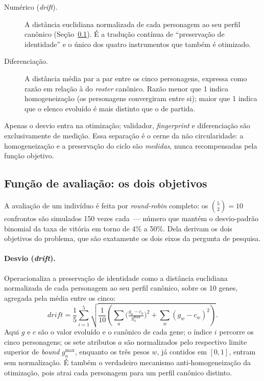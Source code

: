 \documentclass[12pt]{article}
\begin{document}
\begin{description}
\item[Numérico (\emph{drift}).] A distância euclidiana normalizada de cada
personagem ao seu perfil canônico (Seção~\ref{sec:fitness}). É a tradução contínua
de ``preservação de identidade'' e o único dos quatro instrumentos que também é
otimizado.

\item[Diferenciação.] A distância média par a par entre os cinco personagens,
expressa como razão em relação à do \emph{roster} canônico. Razão menor que 1
indica homogeneização (os personagens convergiram entre si); maior que 1 indica
que o elenco evoluído é mais distinto que o de partida.
\end{description}

Apenas o desvio entra na otimização; validador, \emph{fingerprint} e diferenciação
são exclusivamente de medição. Essa separação é o cerne da não circularidade: a
homogeneização e a preservação do ciclo são \emph{medidas}, nunca recompensadas
pela função objetivo.

\subsection{Função de avaliação: os dois objetivos}
\label{sec:fitness}

A avaliação de um indivíduo é feita por \emph{round-robin} completo: os
$\binom{5}{2}=10$ confrontos são simulados 150 vezes cada~--- número que mantém o
desvio-padrão binomial da taxa de vitória em torno de 4\% a 50\%. Dela derivam os
dois objetivos do problema, que são exatamente os dois eixos da pergunta de pesquisa.

\paragraph{Desvio (\emph{drift}).} Operacionaliza a preservação de identidade
como a distância euclidiana normalizada de cada personagem ao seu perfil
canônico, sobre os 10 genes, agregada pela média entre os cinco:
\begin{equation}
\textit{drift} = \frac{1}{5}\sum_{i=1}^{5}
\sqrt{\frac{1}{10}\!\left(\sum_{a}\!\Big(\tfrac{g_{a}-c_{a}}{g_{a}^{\max}}\Big)^{\!2}
+ \sum_{w}(g_{w}-c_{w})^{2}\right)} .
\end{equation}
Aqui $g$ e $c$ são o valor evoluído e o canônico de cada gene; o índice $i$
percorre os cinco personagens; os sete atributos $a$ são normalizados pelo
respectivo limite superior de \emph{bound} $g_{a}^{\max}$, enquanto os três pesos
$w$, já contidos em $[0,1]$, entram sem normalização. É também o verdadeiro
mecanismo anti-homogeneização da otimização, pois atrai cada personagem para um
perfil canônico distinto.
\end{document}
